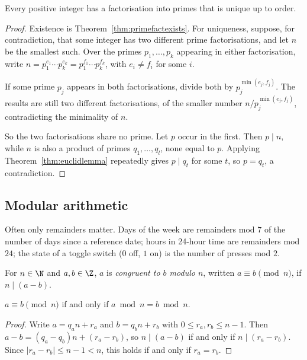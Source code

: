 \begin{theorem}
\label{thm:fta}
Every positive integer has a factorisation into primes that is unique up to order.
\end{theorem}
\begin{proof}
Existence is Theorem~\ref{thm:primefactexists}. For uniqueness, suppose, for contradiction, that some integer has two different prime factorisations, and let $n$ be the smallest such. Over the primes $p_1,\dots,p_k$ appearing in either factorisation, write $n=p_1^{e_1}\cdots p_k^{e_k}=p_1^{f_1}\cdots p_k^{f_k}$, with $e_i\ne f_i$ for some $i$.

If some prime $p_j$ appears in both factorisations, divide both by $p_j^{\min(e_j,f_j)}$. The results are still two different factorisations, of the smaller number $n/p_j^{\min(e_j,f_j)}$, contradicting the minimality of $n$.

So the two factorisations share no prime. Let $p$ occur in the first. Then $p\mid n$, while $n$ is also a product of primes $q_1,\dots,q_l$, none equal to $p$. Applying Theorem~\ref{thm:euclidlemma} repeatedly gives $p\mid q_t$ for some $t$, so $p=q_t$, a contradiction.
\end{proof}

\subsection{Modular arithmetic}
\label{sec:7-10}

\begin{note}
Often only remainders matter. Days of the week are remainders mod $7$ of the number of days since a reference date; hours in 24-hour time are remainders mod $24$; the state of a toggle switch ($0$ off, $1$ on) is the number of presses mod $2$.
\end{note}

\begin{definition}[Congruence]
For $n\in\N$ and $a,b\in\Z$, $a$ is \emph{congruent to $b$ modulo $n$}, written $a\equiv b\pmod n$, if $n\mid(a-b)$.
\end{definition}

\begin{proposition}
\label{thm:congremainder}
$a\equiv b\pmod n$ if and only if $a\bmod n=b\bmod n$.
\end{proposition}
\begin{proof}
Write $a=q_an+r_a$ and $b=q_bn+r_b$ with $0\le r_a,r_b\le n-1$. Then $a-b=(q_a-q_b)n+(r_a-r_b)$, so $n\mid(a-b)$ if and only if $n\mid(r_a-r_b)$. Since $|r_a-r_b|\le n-1<n$, this holds if and only if $r_a=r_b$.
\end{proof}

